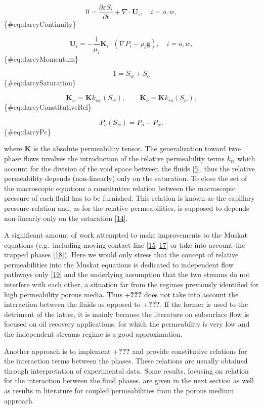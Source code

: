 \documentclass[]{article}
\begin{document}
\[
0=\frac{\partial\varepsilon S_{i}}{\partial t}+\nabla\cdot\mathbf{U}_{i},\quad i=o,w,
\] \{\#eq:darcyContinuity\}

\[
\mathbf{U}_{i}=-\frac{1}{\mu_{i}}\mathbf{K}_{i}\cdot(\nabla P_{i}-\rho_{i}\mathbf{g}),\quad i=o,w,
\] \{\#eq:darcyMomentum\}

\[
1=S_{w}+S_{o}
\] \{\#eq:darcySaturation\}

\[
\mathbf{K}_{w}=\mathbf{K}k_{rw}(S_{w}),\qquad\mathbf{K}_{o}=\mathbf{K}k_{ro}(S_{w}),
\] \{\#eq:darcyConstitutiveRel\}

\[
P_{c}(S_{w})=P_{o}-P_{w}.
\] \{\#eq:darcyPc\}

where \(\mathbf{K}\) is the absolute permeability tensor. The
generalization toward two-phase flows involves the introduction of the
relative permeability terms \(k_{ri}\) which account for the division of
the void space between the fluids
{[}\protect\hyperlink{ref-dullien2012porous}{5}{]}, thus the relative
permeability depends (non-linearly) only on the saturation. To close the
set of the macroscopic equations a constitutive relation between the
macroscopic pressure of each fluid has to be furnished. This relation is
known as the capillary pressure relation and, as for the relative
permeabilities, is supposed to depends non-linearly only on the
saturation {[}\protect\hyperlink{ref-leverett1941capillary}{14}{]}.

A significant amount of work attempted to make improvements to the
Muskat equations (e.g.~including moving contact line
{[}\protect\hyperlink{ref-kalaydjian1992dynamic}{15}--\protect\hyperlink{ref-barenblatt2003mathematical}{17}{]}
or take into account the trapped phases
{[}\protect\hyperlink{ref-hilfer1998macroscopic}{18}{]}). Here we would
only stress that the concept of relative permeabilities into the Muskat
equations is dedicated to independent flow pathways only
{[}\protect\hyperlink{ref-blunt2017multiphase}{19}{]} and the underlying
assumption that the two streams do not interfere with each other, a
situation far from the regimes previously identified for high
permeability porous media. Thus +\textbf{???} does not take into account
the interaction between the fluids as opposed to +\textbf{???}. If the
former is used to the detriment of the latter, it is mainly because the
literature on subsurface flow is focused on oil recovery applications,
for which the permeability is very low and the independent streams
regime is a good approximation.

Another approach is to implement +\textbf{???} and provide constitutive
relations for the interaction terms between the phases. These relations
are usually obtained through interpretation of experimental data. Some
results, focusing on relation for the interaction between the fluid
phases, are given in the next section as well as results in literature
for coupled permeabilities from the porous medium approach.
\end{document}
